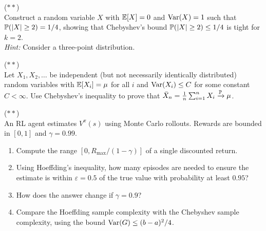 \documentclass[11pt,a4paper]{article}
\begin{document}
\begin{exercise}
\textnormal{(\(\ast\ast\))} \\
Construct a random variable $X$ with $\mathbb{E}[X] = 0$ and $\operatorname{Var}(X) = 1$
such that $\mathbb{P}(|X| \geq 2) = 1/4$, showing that Chebyshev's
bound $\mathbb{P}(|X| \geq 2) \leq 1/4$ is tight for $k = 2$.
\\
\textit{Hint:} Consider a three-point distribution.
\end{exercise}

\begin{exercise}
\textnormal{(\(\ast\ast\))} \\
Let $X_1, X_2, \ldots$ be independent (but not necessarily
identically distributed) random variables with $\mathbb{E}[X_i] = \mu$ for
all $i$ and $\operatorname{Var}(X_i) \leq C$ for some constant $C < \infty$.
Use Chebyshev's inequality to prove that
$\bar{X}_n = \frac{1}{n}\sum_{i=1}^n X_i \xrightarrow{\mathbb{P}} \mu$.
\end{exercise}

\begin{exercise}
\textnormal{(\(\ast\ast\))} \\
An RL agent estimates $V^\pi(s)$ using Monte Carlo rollouts. Rewards
are bounded in $[0, 1]$ and $\gamma = 0.99$.
\begin{enumerate}[nosep,label=(\alph*)]
    \item Compute the range $[0, R_{\max}/(1-\gamma)]$ of a single
    discounted return.
    \item Using Hoeffding's inequality, how many episodes are needed
    to ensure the estimate is within $\varepsilon = 0.5$ of the true
    value with probability at least $0.95$?
    \item How does the answer change if $\gamma = 0.9$?
    \item Compare the Hoeffding sample complexity with the Chebyshev
    sample complexity, using the bound
    $\operatorname{Var}(G) \leq (b-a)^2/4$.
\end{enumerate}
\end{exercise}
\end{document}
